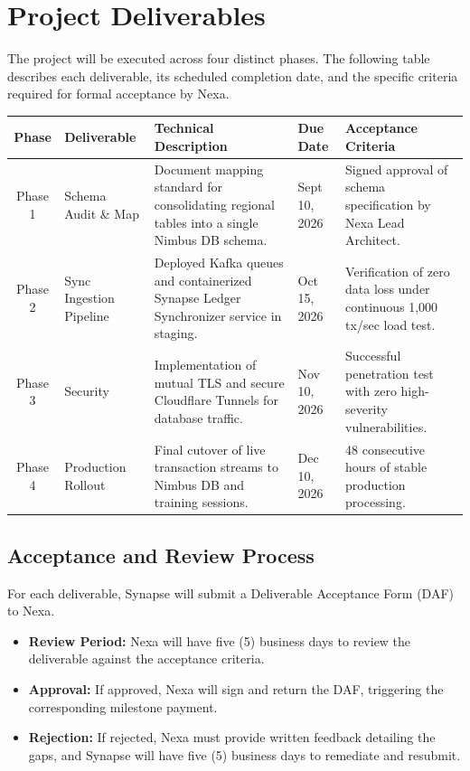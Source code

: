 \section{Project Deliverables}
The project will be executed across four distinct phases. The following table describes each deliverable, its scheduled completion date, and the specific criteria required for formal acceptance by Nexa.

\vspace{0.4cm}
\noindent
\begin{tabularx}{\textwidth}{@{} c l X l X @{}}
  \toprule
  \bfseries Phase & \bfseries Deliverable & \bfseries Technical Description & \bfseries Due Date & \bfseries Acceptance Criteria \\
  \midrule
  Phase 1 & Schema Audit \& Map & Document mapping standard for consolidating regional tables into a single Nimbus DB schema. & Sept 10, 2026 & Signed approval of schema specification by Nexa Lead Architect. \\
  \rowcolor{lightbg} Phase 2 & Sync Ingestion Pipeline & Deployed Kafka queues and containerized Synapse Ledger Synchronizer service in staging. & Oct 15, 2026 & Verification of zero data loss under continuous 1,000 tx/sec load test. \\
  Phase 3 & Security & Implementation of mutual TLS and secure Cloudflare Tunnels for database traffic. & Nov 10, 2026 & Successful penetration test with zero high-severity vulnerabilities. \\
  \rowcolor{lightbg} Phase 4 & Production Rollout & Final cutover of live transaction streams to Nimbus DB and training sessions. & Dec 10, 2026 & 48 consecutive hours of stable production processing. \\
  \bottomrule
\end{tabularx}
\vspace{0.4cm}

\subsection{Acceptance and Review Process}
For each deliverable, Synapse will submit a Deliverable Acceptance Form (DAF) to Nexa.
\begin{itemize}[label=\textcolor{secondary}{\faInfoCircle}, leftmargin=*]
  \item \textbf{Review Period:} Nexa will have five (5) business days to review the deliverable against the acceptance criteria.
  \item \textbf{Approval:} If approved, Nexa will sign and return the DAF, triggering the corresponding milestone payment.
  \item \textbf{Rejection:} If rejected, Nexa must provide written feedback detailing the gaps, and Synapse will have five (5) business days to remediate and resubmit.
\end{itemize}
